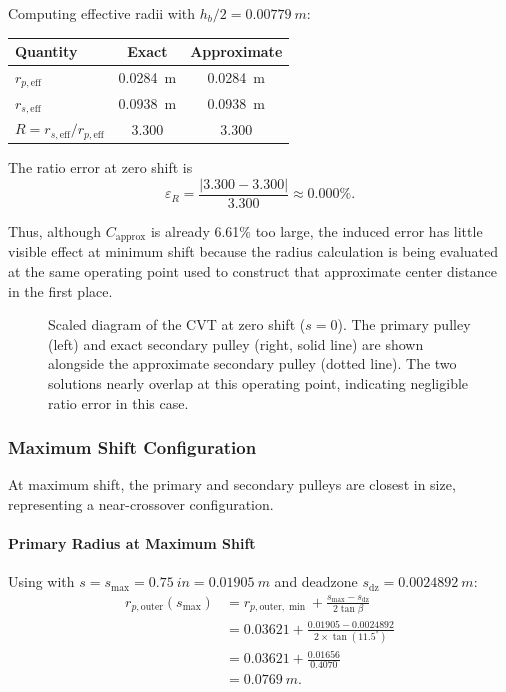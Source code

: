 \documentclass[11pt]{article}
\numberwithin{equation}{section}
\begin{document}
Computing effective radii with $h_b/2 = \SI{0.00779}{m}$:

\begin{center}
\begin{tabular}{lcc}
\toprule
\textbf{Quantity} & \textbf{Exact} & \textbf{Approximate} \\
\midrule
$r_{p,\text{eff}}$ & \SI{0.0284}{m} & \SI{0.0284}{m} \\
$r_{s,\text{eff}}$ & \SI{0.0938}{m} & \SI{0.0938}{m} \\
$R = r_{s,\text{eff}}/r_{p,\text{eff}}$ & 3.300 & 3.300 \\
\bottomrule
\end{tabular}
\end{center}

The ratio error at zero shift is
\[
\varepsilon_R = \frac{|3.300 - 3.300|}{3.300} \approx 0.000\%.
\]

Thus, although $C_{\mathrm{approx}}$ is already 6.61\% too large, the induced
error has little visible effect at minimum shift because the radius calculation
is being evaluated at the same operating point used to construct that
approximate center distance in the first place.

\begin{figure}[H]
\centering
\caption{Scaled diagram of the CVT at zero shift ($s = 0$).
The primary pulley (left) and exact secondary pulley (right, solid line)
are shown alongside the approximate secondary pulley (dotted line).
The two solutions nearly overlap at this operating point,
indicating negligible ratio error in this case.}
\label{fig:approx_zero_shift}
\end{figure}

\subsubsection{Maximum Shift Configuration}
\label{sec:approx_maxshift}

At maximum shift, the primary and secondary pulleys are closest in size,
representing a near-crossover configuration.

\paragraph{Primary Radius at Maximum Shift}

Using  with $s = s_{\max} = \SI{0.75}{in} = \SI{0.01905}{m}$
and deadzone $s_{\mathrm{dz}} = \SI{0.0024892}{m}$:
\begin{align}
r_{p,\text{outer}}(s_{\max})
&= r_{p,\text{outer},\min} + \frac{s_{\max} - s_{\mathrm{dz}}}{2\tan\beta} \nonumber\\[4pt]
&= 0.03621 + \frac{0.01905 - 0.0024892}{2 \times \tan(11.5^\circ)} \nonumber\\[4pt]
&= 0.03621 + \frac{0.01656}{0.4070} \nonumber\\[4pt]
&= \SI{0.0769}{m}.
\end{align}
\end{document}
